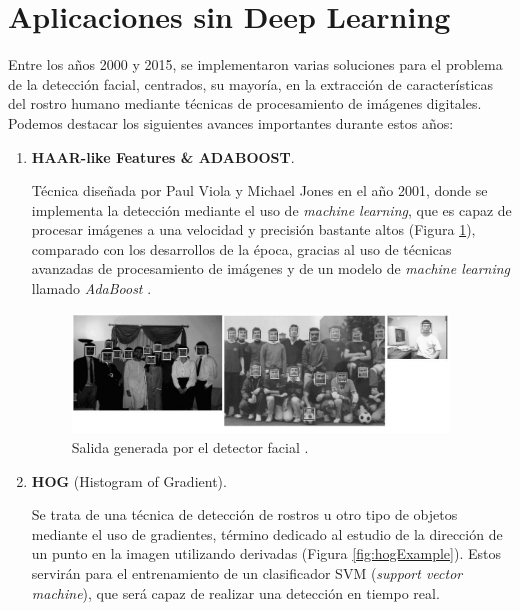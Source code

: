 \vspace{-0.7cm}
\section{Aplicaciones sin Deep Learning}
\vspace{-0.5cm}

Entre los años 2000 y 2015, se implementaron varias soluciones para el problema de la detección facial, centrados, su mayoría, en la extracción de características del rostro humano mediante técnicas de procesamiento de imágenes digitales. Podemos destacar los siguientes avances importantes durante estos años:

\begin{enumerate}
	\item \textbf{HAAR-like Features \& ADABOOST}.
	
	Técnica diseñada por Paul Viola y Michael Jones en el año 2001, donde se implementa la detección mediante el uso de \textit{machine learning}, que es capaz de procesar imágenes a una velocidad y precisión bastante altos (Figura \ref{fig:haarExample}), comparado con los desarrollos de la época, gracias al uso de técnicas avanzadas de procesamiento de imágenes y de un modelo de \textit{machine learning} llamado \textit{AdaBoost} \cite{paulViola}. 
	
	\begin{figure}[htp]
		\centering
		\includegraphics[width=10cm]{imagenes/violayjones_detector.png}
		\caption[Salida generada por el detector facial.]{Salida generada por el detector facial \cite{paulViola}.}
		\label{fig:haarExample}
	\end{figure}
	
	\item \textbf{HOG} (Histogram of Gradient).
	
	Se trata de una técnica de detección de rostros u otro tipo de objetos mediante el uso de gradientes, término dedicado al estudio de la dirección de un punto en la imagen utilizando derivadas (Figura \ref{fig:hogExample}). Estos servirán para el entrenamiento de un clasificador SVM (\textit{support vector machine}), que será capaz de realizar una detección en tiempo real.
	

\end{enumerate}
